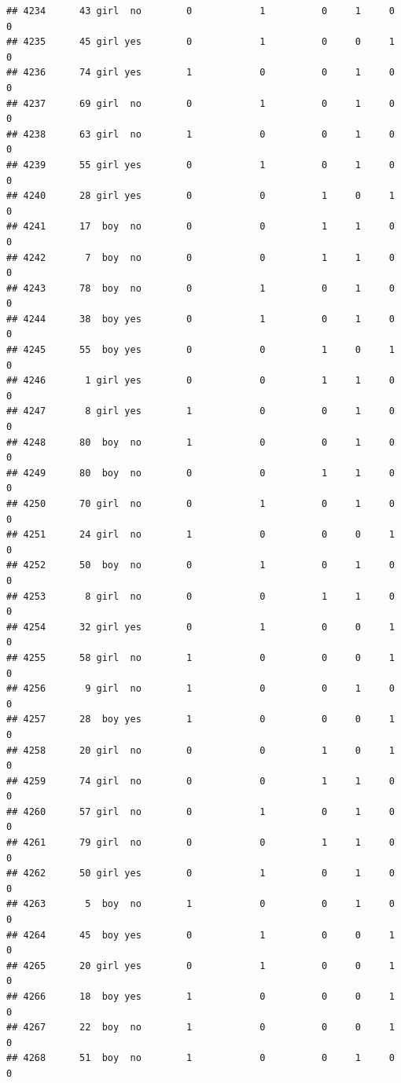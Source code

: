 \documentclass[man]{apa6}
\begin{document}
\begin{verbatim}
## 4234      43 girl  no        0            1          0     1     0     0
## 4235      45 girl yes        0            1          0     0     1     0
## 4236      74 girl yes        1            0          0     1     0     0
## 4237      69 girl  no        0            1          0     1     0     0
## 4238      63 girl  no        1            0          0     1     0     0
## 4239      55 girl yes        0            1          0     1     0     0
## 4240      28 girl yes        0            0          1     0     1     0
## 4241      17  boy  no        0            0          1     1     0     0
## 4242       7  boy  no        0            0          1     1     0     0
## 4243      78  boy  no        0            1          0     1     0     0
## 4244      38  boy yes        0            1          0     1     0     0
## 4245      55  boy yes        0            0          1     0     1     0
## 4246       1 girl yes        0            0          1     1     0     0
## 4247       8 girl yes        1            0          0     1     0     0
## 4248      80  boy  no        1            0          0     1     0     0
## 4249      80  boy  no        0            0          1     1     0     0
## 4250      70 girl  no        0            1          0     1     0     0
## 4251      24 girl  no        1            0          0     0     1     0
## 4252      50  boy  no        0            1          0     1     0     0
## 4253       8 girl  no        0            0          1     1     0     0
## 4254      32 girl yes        0            1          0     0     1     0
## 4255      58 girl  no        1            0          0     0     1     0
## 4256       9 girl  no        1            0          0     1     0     0
## 4257      28  boy yes        1            0          0     0     1     0
## 4258      20 girl  no        0            0          1     0     1     0
## 4259      74 girl  no        0            0          1     1     0     0
## 4260      57 girl  no        0            1          0     1     0     0
## 4261      79 girl  no        0            0          1     1     0     0
## 4262      50 girl yes        0            1          0     1     0     0
## 4263       5  boy  no        1            0          0     1     0     0
## 4264      45  boy yes        0            1          0     0     1     0
## 4265      20 girl yes        0            1          0     0     1     0
## 4266      18  boy yes        1            0          0     0     1     0
## 4267      22  boy  no        1            0          0     0     1     0
## 4268      51  boy  no        1            0          0     1     0     0

\end{verbatim}
\end{document}
